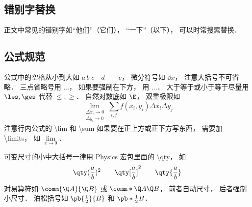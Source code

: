 \subsection{错别字替换}
正文中常见的错别字如“他们”（它们）， “一下”（以下）， 可以时常搜索替换．

\subsection{公式规范}
公式中的空格从小到大如 $a\, b\; c\quad d\qquad e$， 微分符号如 $\dd{x}$， 注意大括号不可省略． 三点省略号用 $\dots$， 如果要强制在下方， 用 $\ldots$． 大于等于或小于等于尽量用 $\les, \ges$ 代替 $\le, \ge$． 自然对数底如 $\E$， 双重极限如
\begin{equation}
\lim_{\substack{\Delta x_i\to 0\\ \Delta y_i\to 0}} \sum_{i, j} f(x_i,y_i) \Delta x_i \Delta y_j
\end{equation}
注意行内公式的 \textbackslash lim 和 \textbackslash sum 如果要在正上方或正下方写东西， 需要加 \textbackslash limits， 如 $\lim\limits_{x\to 0}$．

可变尺寸的小中大括号一律用 Physics 宏包里面的 \textbackslash qty， 如
\begin{equation}
\qty(\frac ab)^2 \qquad \qty[\frac ab]^2 \qquad \qty{ \frac ab}
\end{equation}
对易算符如 $\comm{\Q A}{\Q B}$ 或 $\comm*{\Q A}{\Q B}$， 前者自动尺寸， 后者强制小尺寸． 泊松括号如 $\pb{\frac12}{B}$ 和 $\pb*{\frac12}{B}$．

